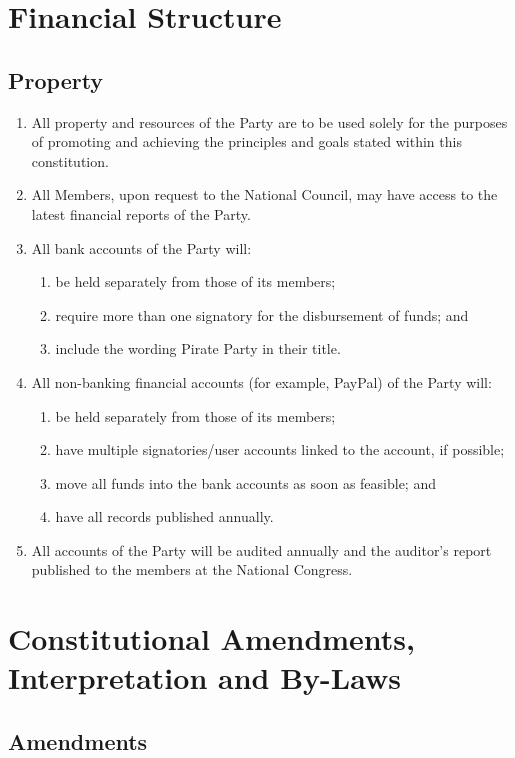 \documentclass[a4paper,titlepage,8.5pt]{article}
\begin{document}
\section{Financial Structure}

\subsection{Property}

\begin{enumerate}
\item All property and resources of the Party are to be used solely for the purposes of promoting and achieving the principles and goals stated within this constitution.
\item All Members, upon request to the National Council, may have access to the latest financial reports of the Party.
\item All bank accounts of the Party will:
\begin{enumerate}
\item be held separately from those of its members;
\item require more than one signatory for the disbursement of funds; and 
\item include the wording Pirate Party in their title.
\end{enumerate}
\item All non-banking financial accounts (for example, PayPal) of the Party will:
\begin{enumerate}
\item be held separately from those of its members;
\item have multiple signatories/user accounts linked to the account, if possible;
\item move all funds into the bank accounts as soon as feasible; and
\item have all records published annually.
\end{enumerate}
\item All accounts of the Party will be audited annually and the auditor’s report published to the members at the National Congress.
\end{enumerate}

\section{Constitutional Amendments, Interpretation and By-Laws}

\subsection{Amendments}
\end{document}
